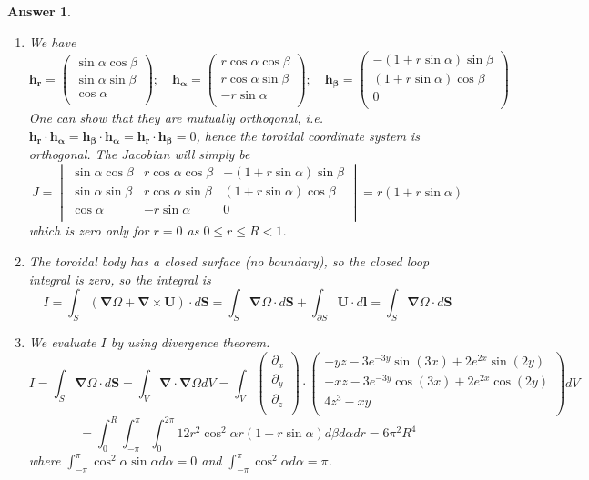 \documentclass[a4paper]{article}
\newtheorem{ans}{Answer}[section]
\theoremstyle{new}
\begin{document}
\begin{ans}\leavevmode
\begin{enumerate}[label=(\alph*)]
    \item We have
$$\mathbf{h_r}=\begin{pmatrix}\sin\alpha\cos\beta\\\sin\alpha\sin\beta\\\cos\alpha\\\end{pmatrix};\quad\boldsymbol{h_\alpha}=\begin{pmatrix}r\cos\alpha\cos\beta\\r\cos\alpha\sin\beta\\-r\sin\alpha\\\end{pmatrix};\quad\boldsymbol{h_\beta}=\begin{pmatrix}-(1+r\sin\alpha)\sin\beta\\(1+r\sin\alpha)\cos\beta\\0\\\end{pmatrix}$$
One can show that they are mutually orthogonal, i.e. $\boldsymbol{h_r}\cdot\boldsymbol{h_\alpha}=\boldsymbol{h_\beta}\cdot\boldsymbol{h_\alpha}=\boldsymbol{h_r}\cdot\boldsymbol{h_\beta}=0$, hence the toroidal coordinate system is orthogonal. The Jacobian will simply be
$$J=\begin{vmatrix}\sin\alpha\cos\beta&r\cos\alpha\cos\beta&-(1+r\sin\alpha)\sin\beta\\\sin\alpha\sin\beta&r\cos\alpha\sin\beta&(1+r\sin\alpha)\cos\beta\\\cos\alpha&-r\sin\alpha&0\\\end{vmatrix}=r(1+r\sin\alpha)$$
which is zero only for $r=0$ as $0\leq r\leq R<1$.
\item The toroidal body has a closed surface (no boundary), so the closed loop integral is zero, so the integral is 
$$I=\int_S(\boldsymbol{\nabla}\Omega+\boldsymbol{\nabla}\times\mathbf{U})\cdot d\mathbf{S}=\int_S\boldsymbol{\nabla}\Omega\cdot d\mathbf{S}+\int_{\partial S}\mathbf{U}\cdot d\mathbf{l}=\int_S\boldsymbol{\nabla}\Omega\cdot d\mathbf{S}$$
\item We evaluate $I$ by using divergence theorem.
$$I=\int_S\boldsymbol{\nabla}\Omega\cdot d\mathbf{S}=\int_V\boldsymbol{\nabla}\cdot\boldsymbol{\nabla}\Omega dV=\int_V\begin{pmatrix}\partial_x\\\partial_y\\\partial_z\\\end{pmatrix}\cdot\begin{pmatrix}-yz-3e^{-3y}\sin(3x)+2e^{2x}\sin(2y)\\-xz-3e^{-3y}\cos(3x)+2e^{2x}\cos(2y)\\4z^3-xy\\\end{pmatrix}dV$$
$$=\int_0^R\int_{-\pi}^\pi \int_0^{2\pi}12r^2\cos^2\alpha r(1+r\sin\alpha)d\beta d\alpha dr=6\pi^2R^4$$
where $\int_{-\pi}^\pi\cos^2\alpha\sin\alpha d\alpha=0$ and $\int_{-\pi}^\pi\cos^2\alpha d\alpha=\pi$.
\end{enumerate}
\end{ans}
\end{document}
